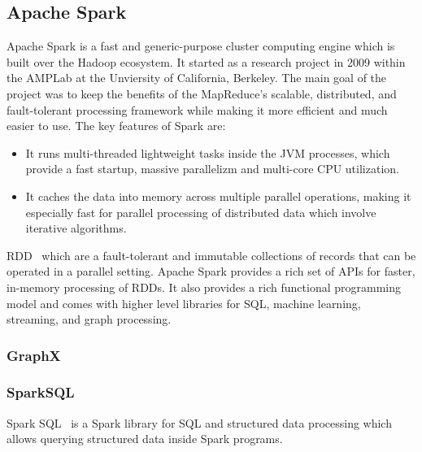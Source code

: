 
\subsection{Apache Spark}
Apache Spark is a fast and generic-purpose cluster computing engine which is built over the Hadoop ecosystem.
It started as a research project in 2009 within the AMPLab at the Unviersity of California, Berkeley.
The main goal of the project was to keep the benefits of the MapReduce's scalable, distributed, and fault-tolerant processing framework while making it more efficient and much easier to use.
The key features of Spark are:
\begin{itemize}
    \item It runs multi-threaded lightweight tasks inside the JVM processes, which provide a fast startup, massive parallelizm and multi-core CPU utilization.
    \item It caches the data into memory across multiple parallel operations, making it especially fast for parallel processing of distributed data which involve iterative algorithms.
\end{itemize}
\gls{RDD}~\cite{zaharia2012resilient} which are a fault-tolerant and immutable collections of records that can be operated in a parallel setting.
Apache Spark provides a rich set of APIs for faster, in-memory processing of RDDs. 
It also provides a rich functional programming model and comes with higher level libraries for SQL, machine learning, streaming, and graph processing.

\subsubsection{GraphX}

\subsubsection{SparkSQL}
Spark SQL~\cite{Armbrust2015SSR} is a Spark library for SQL and structured data processing which allows querying structured data inside Spark programs.
